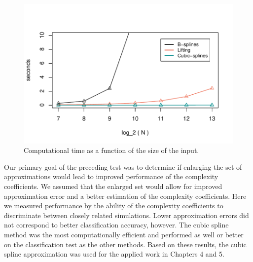 \begin{figure}[!htbp]
  \begin{center}
  \includegraphics[width = \textwidth, keepaspectratio]{./figs/benchmark-benchmark.pdf}
  \end{center}
  \caption{Computational time as a function of the 
  size of the input.}
  \label{fig:benchmark} 
\end{figure}


Our primary goal of the preceding test was to determine 
if enlarging the set of approximations would lead to improved 
performance of the complexity coefficients. We assumed 
that the enlarged set would allow for improved approximation error 
and a better estimation of the complexity coefficients. 
Here we measured 
performance by the ability of the complexity coefficients to 
discriminate between closely related simulations. Lower 
approximation errors did not correspond to better classification
accuracy, however. The cubic spline method was the most computationally efficient and performed as well or better on the classification test as the other methods. Based on these results,
the cubic spline approximation was used for the applied work in 
Chapters 4 and 5.






